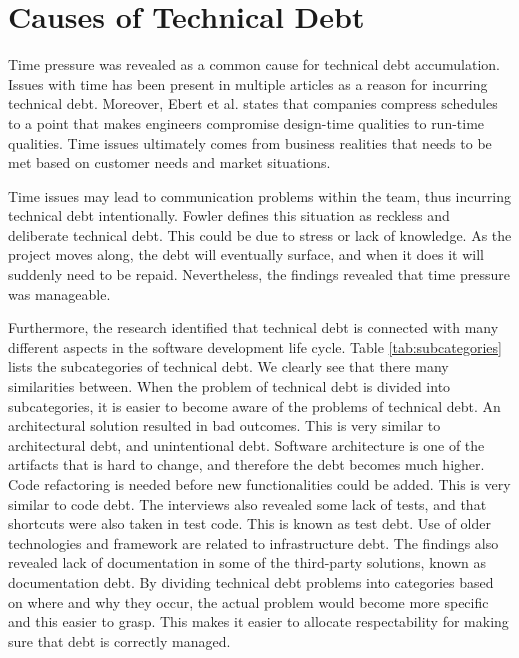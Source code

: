 \section{Causes of Technical Debt}


Time pressure was revealed as a common cause for technical debt accumulation. Issues with time has been present in multiple articles as a reason for incurring technical debt\cite{p29-cunningham,foser076-brown,zazworka2011investigating,p8-codabux,p50-allman,lim-taksande}. Moreover, Ebert et al.\cite{ebert2009embedded} states that companies compress schedules to a point that makes engineers compromise design-time qualities to run-time qualities. Time issues ultimately comes from business realities that needs to be met based on customer needs and market situations. 

Time issues may lead to communication problems within the team, thus incurring technical debt intentionally. Fowler defines this situation as reckless and deliberate technical debt\cite{url-fowler}. This could be due to stress or lack of knowledge. As the project moves along, the debt will eventually surface, and when it does it will suddenly need to be repaid. Nevertheless, the findings revealed that time pressure was manageable.

Furthermore, the research identified that technical debt is connected with many different aspects in the software development life cycle. Table \ref{tab:subcategories} lists the subcategories of technical debt. We clearly see that there many similarities between. When the problem of technical debt is divided into subcategories, it is easier to become aware of the problems of technical debt. An architectural solution resulted in bad outcomes. This is very similar to architectural debt, and unintentional debt. Software architecture is one of the artifacts that is hard to change, and therefore the debt becomes much higher. Code refactoring is needed before new functionalities could be added. This is very similar to code debt\cite{li2015systematic}. The interviews also revealed some lack of tests, and that shortcuts were also taken in test code. This is known as test debt\cite{li2015systematic}. Use of older technologies and framework are related to infrastructure debt\cite{li2015systematic}. The findings also revealed lack of documentation in some of the third-party solutions, known as documentation debt\cite{li2015systematic}. By dividing technical debt problems into categories based on where and why they occur, the actual problem would become more specific and this easier to grasp. This makes it easier to allocate respectability for making sure that debt is correctly managed.

